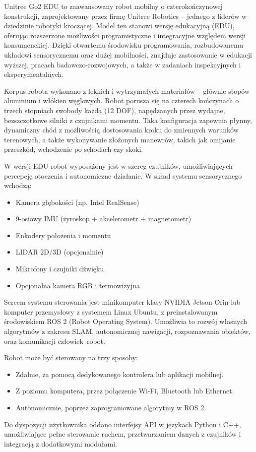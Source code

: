 \documentclass[12pt]{article}
\begin{document}
Unitree Go2 EDU to zaawansowany robot mobilny o czterokończynowej konstrukcji, zaprojektowany przez firmę Unitree Robotics – jednego z liderów w dziedzinie robotyki kroczącej. Model ten stanowi wersję edukacyjną (EDU), oferując rozszerzone możliwości programistyczne i integracyjne względem wersji konsumenckiej. Dzięki otwartemu środowisku programowania, rozbudowanemu układowi sensorycznemu oraz dużej mobilności, znajduje zastosowanie w edukacji wyższej, pracach badawczo-rozwojowych, a także w zadaniach inspekcyjnych i eksperymentalnych.

Korpus robota wykonano z lekkich i wytrzymałych materiałów – głównie stopów aluminium i włókien węglowych. Robot porusza się na czterech kończynach o trzech stopniach swobody każda (12 DOF), napędzanych przez wydajne, bezszczotkowe silniki z czujnikami momentu. Taka konfiguracja zapewnia płynny, dynamiczny chód z możliwością dostosowania kroku do zmiennych warunków terenowych, a także wykonywanie złożonych manewrów, takich jak omijanie przeszkód, wchodzenie po schodach czy skoki.


W wersji EDU robot wyposażony jest w szereg czujników, umożliwiających percepcję otoczenia i autonomiczne działanie. W skład systemu sensorycznego wchodzą:
\begin{itemize}
    \item Kamera głębokości (np. Intel RealSense)
    \item 9-osiowy IMU (żyroskop + akcelerometr + magnetometr)
    \item Enkodery położenia i momentu
    \item LIDAR 2D/3D (opcjonalnie)
    \item Mikrofony i czujniki dźwięku
    \item Opcjonalna kamera RGB i termowizyjna
\end{itemize}

Sercem systemu sterowania jest minikomputer klasy NVIDIA Jetson Orin lub komputer przemysłowy z systemem Linux Ubuntu, z preinstalowanym środowiskiem ROS 2 (Robot Operating System). Umożliwia to rozwój własnych algorytmów z zakresu SLAM, autonomicznej nawigacji, rozpoznawania obiektów, oraz komunikacji człowiek–robot.


Robot może być sterowany na trzy sposoby:
\begin{itemize}
    \item Zdalnie, za pomocą dedykowanego kontrolera lub aplikacji mobilnej.
    \item Z poziomu komputera, przez połączenie Wi-Fi, Bluetooth lub Ethernet.
    \item Autonomicznie, poprzez zaprogramowane algorytmy w ROS 2.
\end{itemize}
Do dyspozycji użytkownika oddano interfejsy API w językach Python i C++, umożliwiające pełne sterowanie ruchem, przetwarzaniem danych z czujników i integracją z dodatkowymi modułami.
\end{document}
